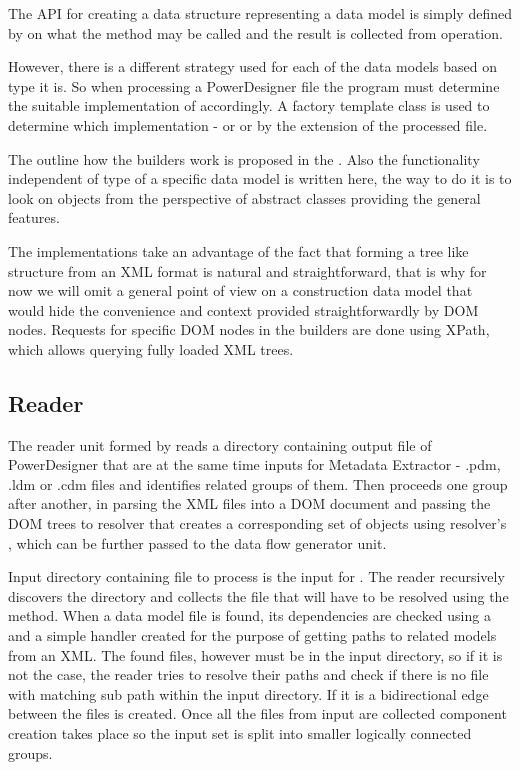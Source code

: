 The API for creating a data structure representing a data model is simply defined by  on what the method  may be called and the result is collected from  operation.

However, there is a different strategy used for each of the data models based on type it is. So when processing a PowerDesigner file the program must determine the suitable implementation of  accordingly. 
A factory template class  is used to determine which implementation -  or  or  by the extension of the processed file.

The outline how the builders work is proposed in the . Also the functionality independent of type of a specific data model is written here, the way to do it is to look on objects from the perspective of abstract classes providing the general features.


The implementations take an advantage of the fact that forming a tree like structure from an XML format is natural and straightforward, that is why for now we will omit a general point of view on a construction data model that would hide the convenience and context provided straightforwardly by DOM nodes. 
Requests for specific DOM nodes in the builders are done using XPath, which allows querying fully loaded XML trees.

\subsection{Reader}

The reader unit formed by  reads a directory containing output file of PowerDesigner that are at the same time inputs for Metadata Extractor - .pdm, .ldm or .cdm files and identifies related groups of them. Then proceeds one group after another, in parsing the XML files into a DOM document and passing the DOM trees to resolver that creates a corresponding set of  objects using resolver's , which can be further passed to the data flow generator unit.
 
Input directory containing file to process is the input for . The reader recursively discovers the directory and collects the file that will have to be resolved using the  method. When a data model file is found, its dependencies are checked using a  and a simple handler  created for the purpose of getting paths to related models from an XML. The found files, however must be in the input directory, so if it is not the case, the reader tries to resolve their paths and check if there is no file with matching sub path within the input directory. If it is a bidirectional edge between the files is created. 
Once all the files from input are collected component creation takes place so the input set is split into smaller logically connected groups.


